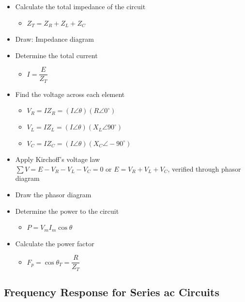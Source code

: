 \documentclass[
  a4paper,
]{article}
\providecommand{\tightlist}{%
  \setlength{\itemsep}{0pt}\setlength{\parskip}{0pt}}
\begin{document}
\begin{itemize}
\item
  Calculate the total impedance of the circuit

  \begin{itemize}
  \tightlist
  \item
    \(Z_T = Z_R + Z_L + Z_C\)
  \end{itemize}
\item
  Draw: Impedance diagram
\item
  Determine the total current

  \begin{itemize}
  \tightlist
  \item
    \(I = \dfrac{E}{Z_T}\)
  \end{itemize}
\item
  Find the voltage across each element

  \begin{itemize}
  \tightlist
  \item
    \(V_R = IZ_R = (I\angle\theta)(R\angle 0^\circ)\)
  \item
    \(V_L = IZ_L = (I\angle\theta)(X_L\angle 90^\circ)\)
  \item
    \(V_C = IZ_C = (I\angle\theta)(X_C\angle -90^\circ)\)
  \end{itemize}
\item
  Apply Kirchoff's voltage law
  \(\sum V = E-V_R-V_L-V_C = 0 \text{ or } E = V_R+V_L+V_C\), verified
  through phasor diagram
\item
  Draw the phasor diagram
\item
  Determine the power to the circuit

  \begin{itemize}
  \tightlist
  \item
    \(P=V_mI_m\cos\theta\)
  \end{itemize}
\item
  Calculate the power factor

  \begin{itemize}
  \tightlist
  \item
    \(F_p = \cos \theta_T = \dfrac{R}{Z_T}\)
  \end{itemize}
\end{itemize}

\subsection{Frequency Response for Series ac
Circuits}\label{frequency-response-for-series-ac-circuits}
\end{document}
